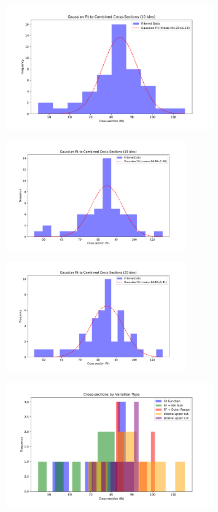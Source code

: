 \documentclass[a4paper,11pt]{article}
\begin{document}
\begin{figure}
	\centering
    \includegraphics[width=0.8\textwidth]{combined_cross_sections_fit(10 bins)(12345).pdf}
\end{figure}
\begin{figure}
	\centering
    \includegraphics[width=0.7\textwidth]{combined_cross_sections_fit(15 bins)(12345).pdf}
\end{figure}
\begin{figure}
	\centering
    \includegraphics[width=0.7\textwidth]{combined_cross_sections_fit(20 bins)(12345).pdf}
\end{figure}
\begin{figure}
	\centering
    \includegraphics[width=0.8\textwidth]{cross_sections_coloured_plot(12345).pdf}
\end{figure}
\end{document}
